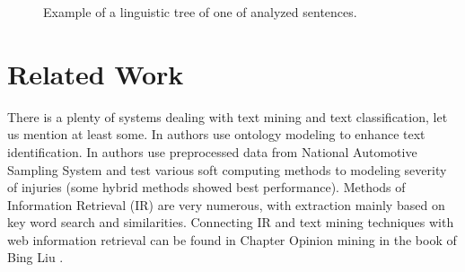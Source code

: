 \begin{multicols}{2}
\begin{figure}
\centerline{}
\caption{Example of a linguistic tree of one of analyzed sentences.}
\label{dedek:tree}
\end{figure}



\section{Related Work} \label{dedek:related}

There is a plenty of systems dealing with text mining and text classification, let us mention at least some. In \cite{dedek:ReYaLiOntoText08} authors use ontology modeling to enhance text identification. In \cite{dedek:CAP} authors use preprocessed data from National Automotive Sampling System and test various soft computing methods to modeling severity of injuries (some hybrid methods showed best performance). Methods of Information Retrieval (IR) are very numerous, with extraction mainly based on key word search and similarities. Connecting IR and text mining techniques with web information retrieval can be found in Chapter Opinion mining in the book of Bing Liu \cite{dedek:WebDataMining}. 



\end{multicols}
